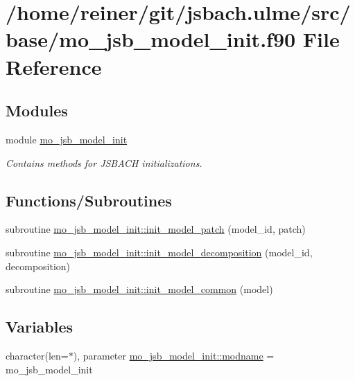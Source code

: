 \hypertarget{mo__jsb__model__init_8f90}{}\section{/home/reiner/git/jsbach.ulme/src/base/mo\+\_\+jsb\+\_\+model\+\_\+init.f90 File Reference}
\label{mo__jsb__model__init_8f90}
\subsection*{Modules}
\begin{DoxyCompactItemize}
\item 
module \hyperlink{namespacemo__jsb__model__init}{mo\+\_\+jsb\+\_\+model\+\_\+init}
\begin{DoxyCompactList}\small\item\em Contains methods for J\+S\+B\+A\+C\+H initializations. \end{DoxyCompactList}\end{DoxyCompactItemize}
\subsection*{Functions/\+Subroutines}
\begin{DoxyCompactItemize}
\item 
subroutine \hyperlink{namespacemo__jsb__model__init_abde13ff24f002945132bb153233d61ea}{mo\+\_\+jsb\+\_\+model\+\_\+init\+::init\+\_\+model\+\_\+patch} (model\+\_\+id, patch)
\item 
subroutine \hyperlink{namespacemo__jsb__model__init_adca97e8b4accd7231a2461e78399ee71}{mo\+\_\+jsb\+\_\+model\+\_\+init\+::init\+\_\+model\+\_\+decomposition} (model\+\_\+id, decomposition)
\item 
subroutine \hyperlink{namespacemo__jsb__model__init_adfe552aef42349bce64eb6bbd05e01e7}{mo\+\_\+jsb\+\_\+model\+\_\+init\+::init\+\_\+model\+\_\+common} (model)
\end{DoxyCompactItemize}
\subsection*{Variables}
\begin{DoxyCompactItemize}
\item 
character(len=$\ast$), parameter \hyperlink{namespacemo__jsb__model__init_a1b4f5a568975c096385432c5e8a209f0}{mo\+\_\+jsb\+\_\+model\+\_\+init\+::modname} = \textquotesingle{}mo\+\_\+jsb\+\_\+model\+\_\+init\textquotesingle{}
\end{DoxyCompactItemize}
